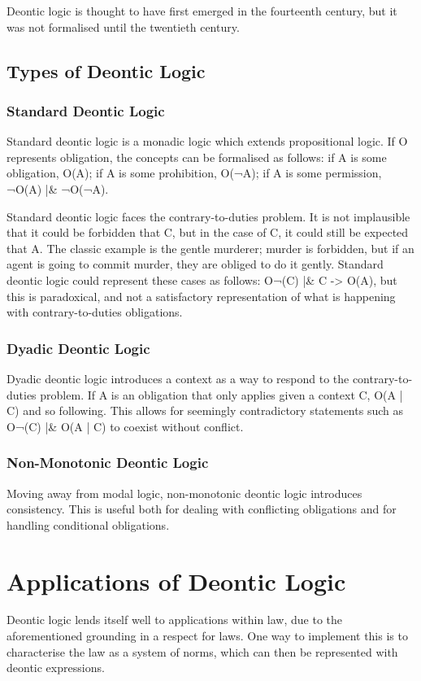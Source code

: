 \documentclass{l4proj}
\begin{document}
Deontic logic is thought to have first emerged in the fourteenth century, but it was not formalised until the twentieth century\cite{sep-logic-deontic}. 

\subsection{Types of Deontic Logic}

\subsubsection{Standard Deontic Logic}
Standard deontic logic is a monadic logic which extends propositional logic. If O represents obligation, the concepts can be formalised as follows: if A is some obligation, O(A); if A is some prohibition, O(¬A); if A is some permission, ¬O(A) |\& ¬O(¬A). 

Standard deontic logic faces the contrary-to-duties problem. It is not implausible that it could be forbidden that C, but in the case of C, it could still be expected that A. The classic example is the gentle murderer; murder is forbidden, but if an agent is going to commit murder, they are obliged to do it gently. Standard deontic logic could represent these cases as follows: O¬(C) |\& C -> O(A), but this is paradoxical, and not a satisfactory representation of what is happening with contrary-to-duties obligations. 

\subsubsection{Dyadic Deontic Logic}
Dyadic deontic logic introduces a context as a way to respond to the contrary-to-duties problem. If A is an obligation that only applies given a context C, O(A | C) and so following. This allows for seemingly contradictory statements such as O¬(C) |\& O(A | C) to coexist without conflict. 

\subsubsection{Non-Monotonic Deontic Logic}
Moving away from modal logic, non-monotonic deontic logic introduces consistency\cite{Powers}. This is useful both for dealing with conflicting obligations and for handling conditional obligations\cite{Horty}. 

\section{Applications of Deontic Logic}%
Deontic logic lends itself well to applications within law, due to the aforementioned grounding in a respect for laws. One way to implement this is to characterise the law as a system of norms\cite{law-jonessergot}, which can then be represented with deontic expressions. 
\end{document}
